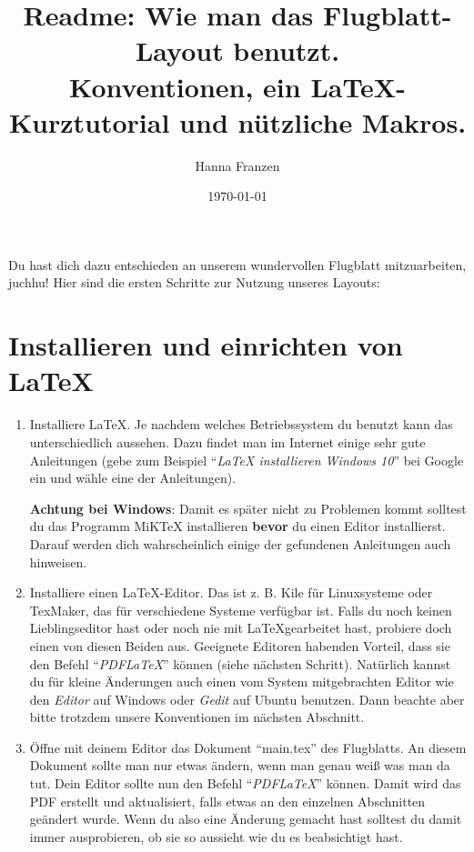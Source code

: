 \documentclass[a4paper,10pt]{article}
\title{Readme: Wie man das Flugblatt-Layout benutzt. \\
       Konventionen, ein \LaTeX-Kurztutorial und nützliche Makros.}
\author{Hanna Franzen}
\date{\today}
\begin{document}
\maketitle

Du hast dich dazu entschieden an unserem wundervollen Flugblatt mitzuarbeiten, juchhu!
Hier sind die ersten Schritte zur Nutzung unseres Layouts:

\section{Installieren und einrichten von \LaTeX}

\begin{enumerate}
   \item Installiere \LaTeX. Je nachdem welches Betriebssystem du benutzt kann das unterschiedlich aussehen.
         Dazu findet man im Internet einige sehr gute Anleitungen 
         (gebe zum Beispiel ``\textit{LaTeX installieren Windows 10}'' bei Google ein und wähle eine der Anleitungen).
      
         \textbf{Achtung bei Windows}: Damit es später nicht zu Problemen kommt solltest du das Programm MiKTeX 
         installieren \textbf{bevor} du einen Editor installierst. Darauf werden dich wahrscheinlich einige der gefundenen 
         Anleitungen auch hinweisen.
      
   \item Installiere einen \LaTeX-Editor. Das ist z. B. Kile für Linuxsysteme oder TexMaker, das für verschiedene
         Systeme verfügbar ist. Falls du noch keinen Lieblingseditor hast oder noch nie mit \LaTeX gearbeitet hast,
         probiere doch einen von diesen Beiden aus. Geeignete Editoren habenden Vorteil, dass sie den Befehl
         ``\textit{PDFLaTeX}'' können (siehe nächsten Schritt).
         Natürlich kannst du für kleine Änderungen auch einen vom System mitgebrachten Editor wie den \textit{Editor}
         auf Windows oder \textit{Gedit} auf Ubuntu benutzen. Dann beachte aber bitte trotzdem unsere Konventionen im
         nächsten Abschnitt.
        
   \item Öffne mit deinem Editor das Dokument ``main.tex'' des Flugblatts. An diesem Dokument sollte man nur etwas ändern,
         wenn man genau weiß was man da tut. Dein Editor sollte nun den Befehl ``\textit{PDFLaTeX}'' können. 
         Damit wird das PDF erstellt und aktualisiert, falls etwas an den einzelnen Abschnitten geändert wurde. 
         Wenn du also eine Änderung gemacht hast solltest du damit immer ausprobieren, ob sie so aussieht wie du es 
         beabsichtigt hast.
\end{enumerate}
\end{document}

